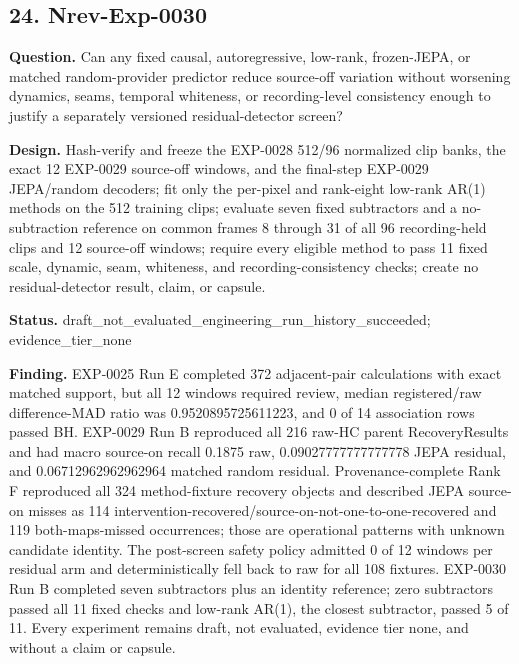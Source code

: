 \subsection{24. Nrev-Exp-0030}

\textbf{Question.} Can any fixed causal, autoregressive, low-rank, frozen-JEPA, or matched random-provider predictor reduce source-off variation without worsening dynamics, seams, temporal whiteness, or recording-level consistency enough to justify a separately versioned residual-detector screen?

\textbf{Design.} Hash-verify and freeze the EXP-0028 512/96 normalized clip banks, the exact 12 EXP-0029 source-off windows, and the final-step EXP-0029 JEPA/random decoders; fit only the per-pixel and rank-eight low-rank AR(1) methods on the 512 training clips; evaluate seven fixed subtractors and a no-subtraction reference on common frames 8 through 31 of all 96 recording-held clips and 12 source-off windows; require every eligible method to pass 11 fixed scale, dynamic, seam, whiteness, and recording-consistency checks; create no residual-detector result, claim, or capsule.

\textbf{Status.} draft\_not\_evaluated\_engineering\_run\_history\_succeeded; evidence\_tier\_none

\textbf{Finding.} EXP-0025 Run E completed 372 adjacent-pair calculations with exact matched support, but all 12 windows required review, median registered/raw difference-MAD ratio was 0.9520895725611223, and 0 of 14 association rows passed BH. EXP-0029 Run B reproduced all 216 raw-HC parent RecoveryResults and had macro source-on recall 0.1875 raw, 0.09027777777777778 JEPA residual, and 0.06712962962962964 matched random residual. Provenance-complete Rank F reproduced all 324 method-fixture recovery objects and described JEPA source-on misses as 114 intervention-recovered/source-on-not-one-to-one-recovered and 119 both-maps-missed occurrences; those are operational patterns with unknown candidate identity. The post-screen safety policy admitted 0 of 12 windows per residual arm and deterministically fell back to raw for all 108 fixtures. EXP-0030 Run B completed seven subtractors plus an identity reference; zero subtractors passed all 11 fixed checks and low-rank AR(1), the closest subtractor, passed 5 of 11. Every experiment remains draft, not evaluated, evidence tier none, and without a claim or capsule.

